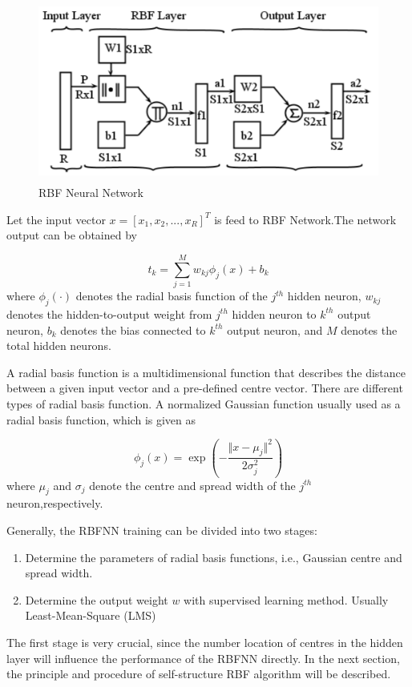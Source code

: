 \documentclass[12pt,a4paper,oneside]{article}
\numberwithin{equation}{section}
\numberwithin{algorithm}{section}
\begin{document}
\begin{figure}[hbtp]
\centering
\includegraphics[width=350pt,height=170pt]{figures/RBF}
\caption{RBF Neural Network}
\label{figure_rbf}
\end{figure}
Let the input vector $x=[x_1,x_2,...,x_R]^T$ is feed to RBF Network.The network output can be obtained by

\begin{equation}\label{equation_rbf_network_output}
t_k=\sum\limits_{j=1}^{M}w_{kj}\phi_j(x)+b_k
\end{equation}
where $\phi_j(\cdot)$ denotes the radial basis function of the $j^{th}$ hidden neuron, $w_{kj}$ denotes the hidden-to-output weight from $j^{th}$ hidden neuron to $k^{th}$ output neuron, $b_k$ denotes the bias connected to $k^{th}$ output neuron, and $M$ denotes the total hidden neurons.

A radial basis function is a multidimensional function that describes the distance between a given input vector and a pre-defined centre vector. There are different types of radial basis function.  A normalized Gaussian function usually used as a radial basis function, which is given as

\begin{equation}\label{equation_radial_basis_fuction}
\phi_j(x)=\exp(-\frac{\Vert x-\mu_j\Vert^2}{2\sigma^2_j})
\end{equation}
where $\mu_j$ and $\sigma_j$ denote the centre and spread width of the $j^{th}$ neuron,respectively.

Generally, the RBFNN training can be divided into two stages:
\begin{enumerate}
\item Determine the parameters of radial basis functions, i.e., Gaussian centre and spread width.
\item Determine the output weight $w$ with supervised learning method. Usually Least-Mean-Square (LMS)
\end{enumerate}
The first stage is very crucial, since the number location of centres in the hidden layer will influence the performance of the RBFNN directly. In the next section, the principle and procedure of self-structure RBF algorithm will be described.
\end{document}

